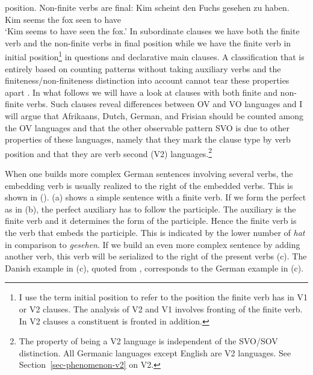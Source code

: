 position. Non-finite verbs are final: 
\ea
\gll Kim scheint den Fuchs gesehen zu haben.\\
     Kim seems   the fox  seen to have\\
\glt `Kim seems to have seen the fox.'
\z
In subordinate clauses we have both the finite verb and the non-finite verbs in final position while
we have the finite verb in initial position\footnote{%
  I use the term initial position to refer to the position the finite verb has in V1 or V2 clauses. The
  analysis of V2 and V1 involves fronting of the finite verb. In V2 clauses a constituent is fronted
  in addition.
} in questions and declarative main clauses.
A classification that is entirely based on counting patterns without taking auxiliary verbs and the
finiteness/non-finiteness distinction into account cannot tear these properties apart \citep[Section~3]{Hoehle83a}. In what follows we will have a look at clauses with
both finite and non-finite verbs. Such clauses reveal differences between OV and VO languages and I will argue that Afrikaans, Dutch,
German, and Frisian should be counted among the OV languages and that the other observable pattern
SVO is due to other properties of these languages, namely that they mark the clause type by verb
position and that they are verb second (V2) languages.\footnote{%
  The property of being a V2 language is independent of the SVO/SOV distinction. All Germanic
  languages except English are V2 languages. See Section~\ref{sec-phenomenon-v2} on V2.
}

When one builds more complex German sentences involving several verbs, the embedding verb is usually
realized to the right of the embedded verbs. This is shown in (). (a) shows a simple
sentence with a finite verb. If we form the perfect as in (b), the perfect auxiliary has to
follow the participle. The auxiliary is the finite verb and it determines the form of the
participle. Hence the finite verb is the verb that embeds the participle. This is indicated by the
lower number of \emph{hat} in comparison to \emph{gesehen}. If we build an even more complex
sentence by adding another verb, this verb will be serialized to the right of the present verbs
(c).  The Danish example in (c), quoted from \citet[]{Oersnes2009b}, corresponds to the
German example in (c).

